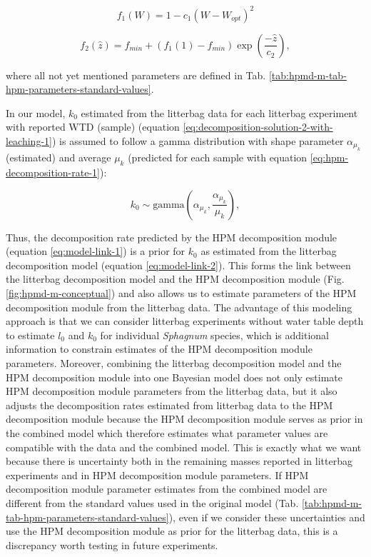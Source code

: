 \documentclass[esd, manuscript]{copernicus}
\begin{document}
\begin{equation}
f_1(W) = 1 - c_1(W - W_{opt})^2
\label{eq:hpm-moisture-modifier-1}
\end{equation}

\begin{equation}
f_2(\hat{z}) = f_{min} + (f_1(1) - f_{min}) \exp \left(\frac{-\hat{z}}{c_2} \right),
\label{eq:hpm-moisture-modifier-2}
\end{equation}

where all not yet mentioned parameters are defined in Tab. \ref{tab:hpmd-m-tab-hpm-parameters-standard-values}.

In our model, \(k_0\) estimated from the litterbag data for each litterbag experiment with reported WTD (sample) (equation \eqref{eq:decomposition-solution-2-with-leaching-1}) is assumed to follow a gamma distribution with shape parameter \(\alpha_{\mu_k}\) (estimated) and average \(\mu_k\) (predicted for each sample with equation \eqref{eq:hpm-decomposition-rate-1}):

\begin{equation}
k_0 \sim \text{gamma}\left(\alpha_{\mu_k}, \frac{\alpha_{\mu_k}}{\mu_k} \right),
\label{eq:model-link-1}
\end{equation}

Thus, the decomposition rate predicted by the HPM decomposition module (equation \eqref{eq:model-link-1}) is a prior for \(k_0\) as estimated from the litterbag decomposition model (equation \eqref{eq:model-link-2}). This forms the link between the litterbag decomposition model and the HPM decomposition module (Fig. \ref{fig:hpmd-m-conceptual}) and also allows us to estimate parameters of the HPM decomposition module from the litterbag data. The advantage of this modeling approach is that we can consider litterbag experiments without water table depth to estimate \(l_0\) and \(k_0\) for individual \emph{Sphagnum} species, which is additional information to constrain estimates of the HPM decomposition module parameters. Moreover, combining the litterbag decomposition model and the HPM decomposition module into one Bayesian model does not only estimate HPM decomposition module parameters from the litterbag data, but it also adjusts the decomposition rates estimated from litterbag data to the HPM decomposition module because the HPM decomposition module serves as prior in the combined model which therefore estimates what parameter values are compatible with the data and the combined model. This is exactly what we want because there is uncertainty both in the remaining masses reported in litterbag experiments and in HPM decomposition module parameters. If HPM decomposition module parameter estimates from the combined model are different from the standard values used in the original model (Tab. \ref{tab:hpmd-m-tab-hpm-parameters-standard-values}), even if we consider these uncertainties and use the HPM decomposition module as prior for the litterbag data, this is a discrepancy worth testing in future experiments.
\end{document}
